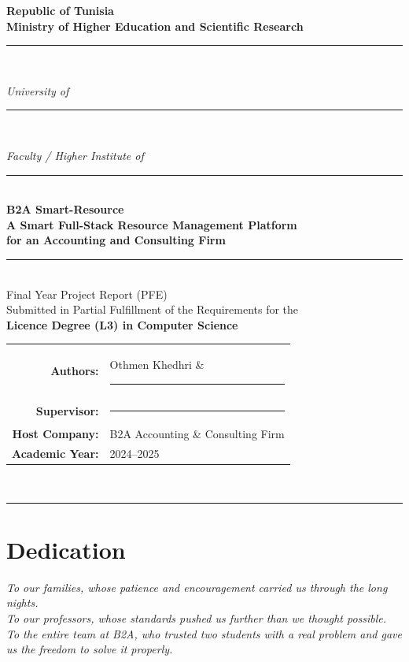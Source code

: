 \documentclass[12pt,a4paper]{report}
\begin{document}
\begin{titlepage}\centering
  \vspace*{1cm}
  {\Large\bfseries\color{b2ablue}
    Republic of Tunisia\\[3pt]
    Ministry of Higher Education and Scientific Research}\\[0.4cm]
  \rule{\linewidth}{1.5pt}\\[0.3cm]
  {\large\itshape University of \rule{5cm}{0.4pt}}\\[0.2cm]
  {\large\itshape Faculty / Higher Institute of \rule{4cm}{0.4pt}}\\[0.9cm]
  {\Huge\bfseries\color{b2ablue} B2A Smart-Resource}\\[0.35cm]
  {\Large\bfseries A Smart Full-Stack Resource Management Platform\\
   for an Accounting and Consulting Firm}\\[0.7cm]
  \rule{\linewidth}{0.8pt}\\[0.6cm]
  {\large Final Year Project Report (PFE)\\
   Submitted in Partial Fulfillment of the Requirements for the\\
   \textbf{Licence Degree (L3) in Computer Science}}\\[0.9cm]
  \begin{tabular}{rl}
    \textbf{Authors:}       & Othmen Khedhri \& \rule{4cm}{0.4pt}\\[4pt]
    \textbf{Supervisor:}    & \rule{6cm}{0.4pt}\\[4pt]
    \textbf{Host Company:}  & B2A Accounting \& Consulting Firm\\[4pt]
    \textbf{Academic Year:} & 2024--2025\\
  \end{tabular}\\[1.5cm]
  \vfill\rule{\linewidth}{1.5pt}
\end{titlepage}

\setcounter{page}{2}

\chapter*{Dedication}\thispagestyle{plain}
\begin{center}\vspace*{1.5cm}
{\itshape To our families, whose patience and encouragement carried us through the long nights.\\[0.4em]
 To our professors, whose standards pushed us further than we thought possible.\\[0.4em]
 To the entire team at B2A, who trusted two students with a real problem
 and gave us the freedom to solve it properly.}
\end{center}
\end{document}
